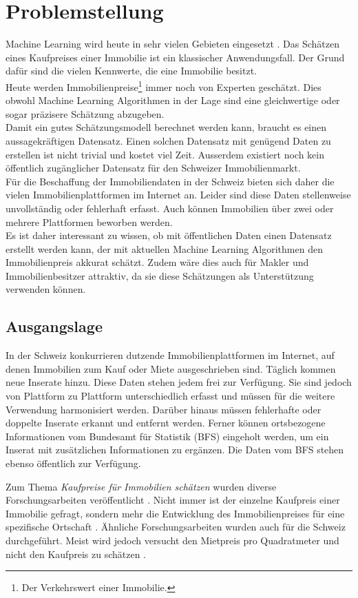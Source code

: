 \section{Problemstellung}
Machine Learning wird heute in sehr vielen Gebieten eingesetzt \cite{forbes}. Das Schätzen eines Kaufpreises einer Immobilie ist ein klassischer Anwendungsfall. Der Grund dafür sind die vielen Kennwerte, die eine Immobilie besitzt.\\
Heute werden Immobilienpreise\footnote{Der Verkehrswert einer Immobilie.} immer noch von Experten geschätzt. Dies obwohl Machine Learning Algorithmen in der Lage sind eine gleichwertige oder sogar präzisere  Schätzung abzugeben.\\
Damit ein gutes Schätzungsmodell berechnet werden kann, braucht es einen aussagekräftigen Datensatz. Einen solchen Datensatz mit genügend Daten zu erstellen ist nicht trivial und kostet viel Zeit. Ausserdem existiert noch kein öffentlich zugänglicher Datensatz für den Schweizer Immobilienmarkt.\\
Für die Beschaffung der Immobiliendaten in der Schweiz bieten sich daher die vielen Immobilienplattformen im Internet an. Leider sind diese Daten stellenweise unvollständig oder fehlerhaft erfasst. Auch können Immobilien über zwei oder mehrere Plattformen beworben werden.\\
Es ist daher interessant zu wissen, ob mit öffentlichen Daten einen Datensatz erstellt werden kann, der mit aktuellen Machine Learning Algorithmen den Immobilienpreis akkurat schätzt. Zudem wäre dies auch für Makler und Immobilienbesitzer attraktiv, da sie diese Schätzungen als Unterstützung verwenden können.
%
\subsection{Ausgangslage}
In der Schweiz konkurrieren dutzende Immobilienplattformen im Internet, auf denen Immobilien zum Kauf oder Miete ausgeschrieben sind. Täglich kommen neue Inserate hinzu. Diese Daten stehen jedem frei zur Verfügung. Sie sind jedoch von Plattform zu Plattform unterschiedlich erfasst und müssen für die weitere Verwendung harmonisiert werden. Darüber hinaus müssen fehlerhafte oder doppelte Inserate erkannt und entfernt werden. Ferner können ortsbezogene Informationen vom Bundesamt für Statistik (BFS) eingeholt werden, um ein Inserat mit zusätzlichen Informationen zu ergänzen. Die Daten vom BFS stehen ebenso öffentlich zur Verfügung.

Zum Thema \textit{Kaufpreise für Immobilien schätzen} wurden diverse Forschungsarbeiten veröffentlicht \cite{existing_work_1, existing_work_2, existing_work_4}.
Nicht immer ist der einzelne Kaufpreis einer Immobilie gefragt, sondern mehr die Entwicklung des Immobilienpreises für eine spezifische Ortschaft \cite{existing_work_5}. Ähnliche Forschungsarbeiten wurden auch für die Schweiz durchgeführt. Meist wird jedoch versucht den Mietpreis pro Quadratmeter und nicht den Kaufpreis zu schätzen \cite{existing_work_3, existing_work_6}.
%
